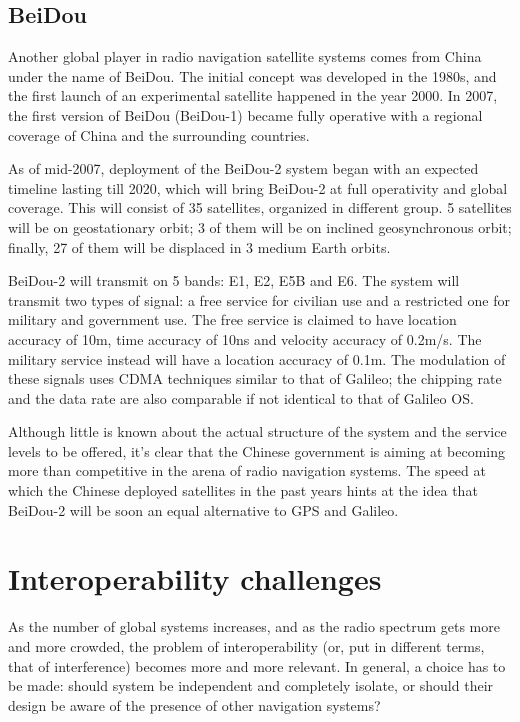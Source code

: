 \subsection{BeiDou}
Another global player in radio navigation satellite systems comes from China
under the name of BeiDou. The initial concept was developed in the 1980s, and
the first launch of an experimental satellite happened in the year 2000. In
2007, the first version of BeiDou (BeiDou-1) became fully operative with a
regional coverage of China and the surrounding countries.

As of mid-2007, deployment of the BeiDou-2 system began with an expected
timeline lasting till 2020, which will bring BeiDou-2 at full operativity and
global coverage. This will consist of 35 satellites, organized in different
group. 5 satellites will be on geostationary orbit; 3 of them will be on
inclined geosynchronous orbit; finally, 27 of them will be displaced in 3 medium
Earth orbits.

BeiDou-2 will transmit on 5 bands: E1, E2, E5B and E6. The system will transmit
two types of signal: a free service for civilian use and a restricted one for
military and government use. The free service is claimed to have location
accuracy of \num{10}\si{m}, time accuracy of \num{10}\si{ns} and velocity
accuracy of \num{0.2}\si{m/s}. The military service instead will have a location
accuracy of \num{0.1}\si{m}. The modulation of these signals uses CDMA
techniques similar to that of Galileo; the chipping rate and the data rate are
also comparable if not identical to that of Galileo OS.

Although little is known about the actual structure of the system and the
service levels to be offered, it's clear that the Chinese government is aiming
at becoming more than competitive in the arena of radio navigation systems. The
speed at which the Chinese deployed satellites in the past years hints at the
idea that BeiDou-2 will be soon an equal alternative to GPS and Galileo.

\section{Interoperability challenges}
As the number of global systems increases, and as the radio spectrum gets more
and more crowded, the problem of interoperability (or, put in different terms,
that of interference) becomes more and more relevant. In general, a choice has
to be made: should system be independent and completely isolate, or should their
design be aware of the presence of other navigation systems?

